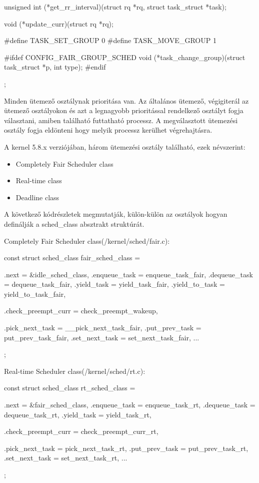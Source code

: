 \begin{cpp}
{	unsigned int (*get_rr_interval)(struct rq *rq,
					struct task_struct *task);

	void (*update_curr)(struct rq *rq);

#define TASK_SET_GROUP		0
#define TASK_MOVE_GROUP		1

#ifdef CONFIG_FAIR_GROUP_SCHED
	void (*task_change_group)(struct task_struct *p, int type);
#endif
};

\end{cpp}
 
Minden ütemező osztálynak prioritása van. 
Az általános ütemező, végigiterál az ütemező osztályokon és azt a legnagyobb prioritással rendelkező osztályt fogja választani, amiben található futtatható processz. A megválasztott ütemezési osztály fogja eldönteni hogy melyik processz kerülhet végrehajtásra.

A kernel 5.8.x verziójában, három ütemezési osztály található, ezek névszerint: 
\begin{itemize}
	 \item Completely Fair Scheduler class
	 \item Real-time class
	 \item Deadline class
\end{itemize}
A következő kódrészletek megmutatják, külön-külön az osztályok hogyan definálják a sched\_class absztrakt struktúrát.

Completely Fair Scheduler class(/kernel/sched/fair.c):
\begin{cpp}
const struct sched_class fair_sched_class = {
	.next			= &idle_sched_class,
	.enqueue_task		= enqueue_task_fair,
	.dequeue_task		= dequeue_task_fair,
	.yield_task		= yield_task_fair,
	.yield_to_task		= yield_to_task_fair,

	.check_preempt_curr	= check_preempt_wakeup,

	.pick_next_task		= __pick_next_task_fair,
	.put_prev_task		= put_prev_task_fair,
	.set_next_task          = set_next_task_fair,
...
};
\end{cpp}

Real-time Scheduler class(/kernel/sched/rt.c):
\begin{cpp}
const struct sched_class rt_sched_class = {
	.next			= &fair_sched_class,
	.enqueue_task		= enqueue_task_rt,
	.dequeue_task		= dequeue_task_rt,
	.yield_task		= yield_task_rt,

	.check_preempt_curr	= check_preempt_curr_rt,

	.pick_next_task		= pick_next_task_rt,
	.put_prev_task		= put_prev_task_rt,
	.set_next_task          = set_next_task_rt,
...
};
\end{cpp}

